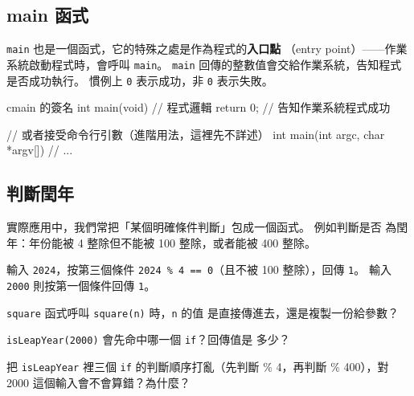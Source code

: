 \subsection{main 函式}

\texttt{main} 也是一個函式，它的特殊之處是作為程式的\textbf{入口點}
（entry point）——作業系統啟動程式時，會呼叫 \texttt{main}。 \texttt{main}
回傳的整數值會交給作業系統，告知程式是否成功執行。 慣例上 \texttt{0}
表示成功，非 \texttt{0} 表示失敗。

\begin{code}{c}{main 的簽名}
int main(void) {
    // 程式邏輯
    return 0;  // 告知作業系統程式成功
}

// 或者接受命令行引數（進階用法，這裡先不詳述）
int main(int argc, char *argv[]) {
    // ...
}
\end{code}

\subsection{判斷閏年}

實際應用中，我們常把「某個明確條件判斷」包成一個函式。 例如判斷是否
為閏年：年份能被 4 整除但不能被 100 整除，或者能被 400 整除。



輸入 \texttt{2024}，按第三個條件 \texttt{2024 \% 4 == 0}（且不被 100
整除），回傳 \texttt{1}。 輸入 \texttt{2000} 則按第一個條件回傳 \texttt{1}。


\begin{drills}[label=drills:func-return-value]
\item \texttt{square} 函式呼叫 \texttt{square(n)} 時，\texttt{n} 的值
是直接傳進去，還是複製一份給參數？
\item \texttt{isLeapYear(2000)} 會先命中哪一個 \texttt{if}？回傳值是
多少？
\item 把 \texttt{isLeapYear} 裡三個 \texttt{if} 的判斷順序打亂（先判斷
\% 4，再判斷 \% 400），對 2000 這個輸入會不會算錯？為什麼？
\end{drills}

